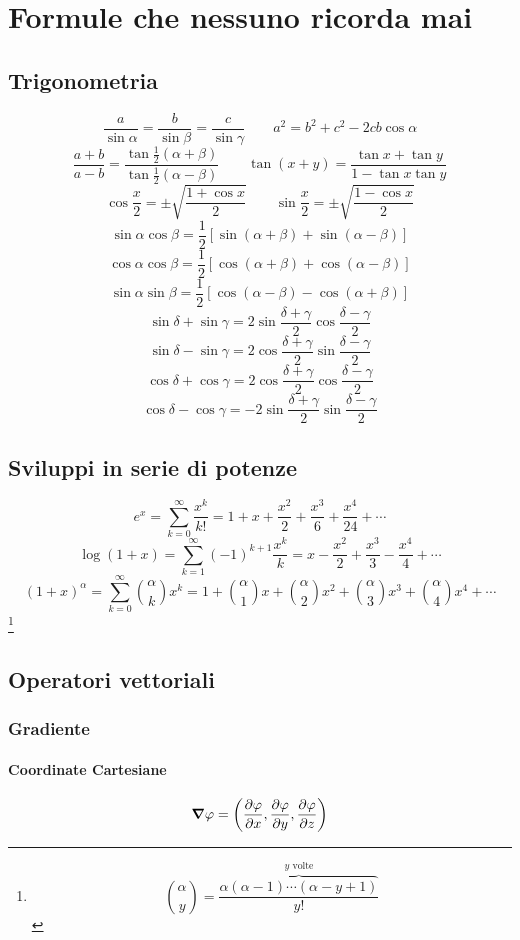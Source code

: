 \chapter{Formule che nessuno ricorda mai}
\section{Trigonometria}
\[\frac{a}{\sin\alpha}=\frac{b}{\sin\beta}=\frac{c}{\sin\gamma}\qquad a^2=b^2+c^2-2cb\cos\alpha\]
\[\frac{a+b}{a-b}=\frac{\tan\frac{1}{2}\left(\alpha+\beta\right)}{\tan\frac{1}{2}\left(\alpha-\beta\right)}\qquad\tan(x+y)=\frac{\tan x+\tan y}{1-\tan x\tan y}\]
\[\cos\frac{x}{2}=\pm\sqrt{\frac{1+\cos x}{2}}\qquad\sin\frac{x}{2}=\pm\sqrt{\frac{1-\cos x}{2}}\]
\[\sin\alpha\cos\beta=\frac{1}{2}\left[\sin\left(\alpha+\beta\right)+\sin\left(\alpha-\beta\right)\right]\]
\[\cos\alpha\cos\beta=\frac{1}{2}\left[\cos\left(\alpha+\beta\right)+\cos\left(\alpha-\beta\right)\right]\]
\[\sin\alpha\sin\beta=\frac{1}{2}\left[\cos\left(\alpha-\beta\right)-\cos\left(\alpha+\beta\right)\right]\]
\[\sin\delta+\sin\gamma=2\sin\frac{\delta+\gamma}{2}\cos\frac{\delta-\gamma}{2}\]
\[\sin\delta-\sin\gamma=2\cos\frac{\delta+\gamma}{2}\sin\frac{\delta-\gamma}{2}\]
\[\cos\delta+\cos\gamma=2\cos\frac{\delta+\gamma}{2}\cos\frac{\delta-\gamma}{2}\]
\[\cos\delta-\cos\gamma=-2\sin\frac{\delta+\gamma}{2}\sin\frac{\delta-\gamma}{2}\]
\section{Sviluppi in serie di potenze}
\[e^x=\sum_{k=0}^\infty\frac{x^k}{k!}=1+x+\frac{x^2}{2}+\frac{x^3}{6}+\frac{x^4}{24}+\cdots\]
\[\log(1+x)=\sum_{k=1}^{\infty}(-1)^{k+1}\frac{x^k}{k}=x-\frac{x^2}{2}+\frac{x^3}{3}-\frac{x^4}{4}+\cdots\]
\[(1+x)^\alpha=\sum_{k=0}^\infty \binom{\alpha}{k}x^k=1+\binom{\alpha}{1}x+\binom{\alpha}{2}x^2+\binom{\alpha}{3}x^3+\binom{\alpha}{4}x^4+\cdots\]\footnote{\[\binom{\alpha}{y}=\frac{\overbrace{\alpha\left(\alpha-1\right)\cdots\left(\alpha-y+1\right)}^{\text{$y$ volte}}}{y!}\]}
\section{Operatori vettoriali}
\subsection{Gradiente}
\subsubsection{Coordinate Cartesiane}
\[\boldsymbol{\nabla}\varphi = \left(\frac{\partial\varphi}{\partial x},\frac{\partial\varphi}{\partial y},\frac{\partial\varphi}{\partial z}\right)\]
